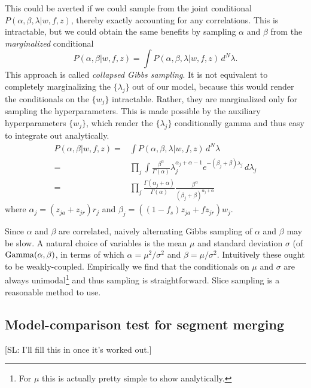 \documentclass[nofootinbib,amssymb,amsmath]{revtex4}
\def\SL#1{{\color [rgb]{0,0,0.8} [SL: #1]}}
\begin{document}
This could be averted if we could sample from the joint conditional $P(\alpha, \beta, \lambda | w, f, z)$, thereby exactly accounting for any correlations.  This is intractable, but we could obtain the same benefits by sampling $\alpha$ and $\beta$ from the \textit{marginalized} conditional 
%
\begin{equation}
P(\alpha, \beta | w, f, z) = \int P(\alpha, \beta, \lambda | w, f, z) \, d^N \lambda.
\end{equation}
%
This approach is called \textit{collapsed Gibbs sampling}.  It is not equivalent to completely marginalizing the $\{ \lambda_j \}$ out of our model, because this would render the conditionals on the $\{ w_j \}$ intractable.  Rather, they are marginalized only for sampling the hyperparameters.  This is made possible by the auxiliary hyperparameters $\{ w_j \}$, which render the $\{ \lambda_j \}$ conditionally gamma and thus easy to integrate out analytically. 
%
\begin{align}
P(\alpha, \beta | w, f, z) =& \int P(\alpha, \beta, \lambda | w, f, z) \, d^N \lambda \\
=& \prod_j \int \frac{\beta^\alpha}{\Gamma(\alpha)} \lambda_j^{\alpha_j + \alpha - 1} e^{-(\beta_j + \beta) \lambda_j} \, d \lambda_j \\
=& \prod_j \frac{\Gamma(\alpha_j + \alpha)}{\Gamma(\alpha)} \frac{\beta^\alpha}{(\beta_j + \beta)^{\alpha_j + \alpha}}
\end{align}
%
where $\alpha_j = (z_{ja} + z_{jr}) r_j$ and $\beta_j = \left( (1-f_s)z_{ja} + f z_{jr} \right) w_j$.

Since $\alpha$ and $\beta$ are correlated, naively alternating Gibbs sampling of $\alpha$ and $\beta$ may be slow.  A natural choice of variables is the mean $\mu$ and standard deviation $\sigma$ (of ${\rm Gamma}(\alpha, \beta)$, in terms of which $\alpha = \mu^2/\sigma^2$ and $\beta = \mu/\sigma^2$.  Intuitively these ought to be weakly-coupled.  Empirically we find that the conditionals on $\mu$ and $\sigma$ are always unimodal\footnote{For $\mu$ this is actually pretty simple to show analytically.} and thus sampling is straightforward.  Slice sampling is a reasonable method to use.

\subsection{Model-comparison test for segment merging} \label{likelihood-based-segment-merging}

\SL{I'll fill this in once it's worked out.}
\end{document}
